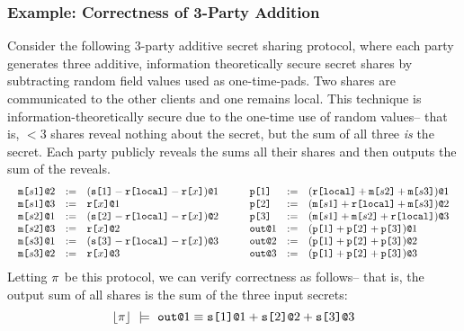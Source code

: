 \subsubsection{Example: Correctness of 3-Party Addition}
\label{section-smt-additive-sharing}
Consider the following 3-party additive secret sharing protocol, where
each party generates three additive, information theoretically secure
secret shares by subtracting random field values used as
one-time-pads. Two shares are communicated to the other clients and
one remains local. This technique is information-theoretically secure
\cite{evans2018pragmatic} due to the one-time use of random
values-- that is, $< 3$ shares reveal nothing about the
secret, but the sum of all three \emph{is} the secret. Each party
publicly reveals the sums all their shares and then outputs the sum of the reveals.
{\footnotesize
$$
\begin{array}{c@{\qquad}c}
\begin{array}{lll}
  \elab{\mesg{s1}}{2} &:=& \elab{(\secret{1} \fminus \locflip \fminus \flip{x})}{1} \\ 
  \elab{\mesg{s1}}{3} &:=& \elab{\flip{x}}{1} \\ 
  \elab{\mesg{s2}}{1} &:=& \elab{(\secret{2} \fminus \locflip \fminus \flip{x})}{2} \\ 
  \elab{\mesg{s2}}{3} &:=& \elab{\flip{x}}{2} \\ 
  \elab{\mesg{s3}}{1} &:=& \elab{(\secret{3} \fminus \locflip \fminus \flip{x})}{3} \\ 
  \elab{\mesg{s3}}{2} &:=& \elab{\flip{x}}{3}
\end{array} & 
\begin{array}{lll}
  \rvl{1} &:=& \elab{(\locflip \fplus \mesg{s2} \fplus \mesg{s3})}{1} \\ 
  \rvl{2} &:=& \elab{(\mesg{s1} \fplus \locflip \fplus \mesg{s3})}{2} \\
  \rvl{3} &:=& \elab{(\mesg{s1} \fplus \mesg{s2} \fplus \locflip)}{3} \\
  \out{1} &:=& \elab{(\rvl{1} \fplus \rvl{2} + \rvl{3})}{1}\\
  \out{2} &:=& \elab{(\rvl{1} \fplus \rvl{2} + \rvl{3})}{2}\\
  \out{3} &:=& \elab{(\rvl{1} \fplus \rvl{2} + \rvl{3})}{3}
\end{array}
\end{array}
$$}
Letting $\pi$ be this protocol, we can verify correctness
as follows-- that is, the output sum of all shares is the sum of the
three input secrets:
$$
\toeq{\prog}\ \models\ \out{1} \eop \sx{1}{1} \fplus \sx{2}{2} \fplus \sx{3}{3}
$$

